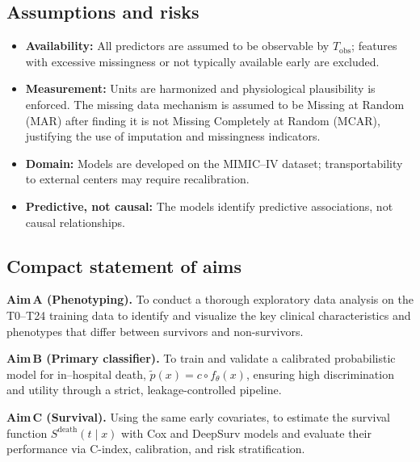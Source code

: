 \subsection{Assumptions and risks}
\begin{itemize}
  \item \textbf{Availability:} All predictors are assumed to be observable by $T_{\mathrm{obs}}$; features with excessive missingness or not typically available early are excluded.
  \item \textbf{Measurement:} Units are harmonized and physiological plausibility is enforced. The missing data mechanism is assumed to be Missing at Random (MAR) after finding it is not Missing Completely at Random (MCAR), justifying the use of imputation and missingness indicators.
  \item \textbf{Domain:} Models are developed on the MIMIC--IV dataset; transportability to external centers may require recalibration.
  \item \textbf{Predictive, not causal:} The models identify predictive associations, not causal relationships.
\end{itemize}

\subsection{Compact statement of aims}
\noindent\textbf{Aim\,A (Phenotyping).} To conduct a thorough exploratory data analysis on the T0--T24 training data to identify and visualize the key clinical characteristics and phenotypes that differ between survivors and non-survivors.

\noindent\textbf{Aim\,B (Primary classifier).} To train and validate a calibrated probabilistic model for in–hospital death, $\tilde p(x)=c\circ f_{\theta}(x)$, ensuring high discrimination and utility through a strict, leakage-controlled pipeline.

\noindent\textbf{Aim\,C (Survival).} Using the same early covariates, to estimate the survival function $S^{\mathrm{death}}(t\mid x)$ with Cox and DeepSurv models and evaluate their performance via C-index, calibration, and risk stratification.
